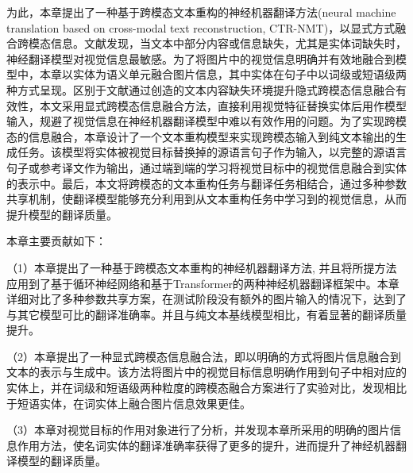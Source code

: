 为此，本章提出了一种基于跨模态文本重构的神经机器翻译方法(neural machine translation based on cross-modal text reconstruction, CTR-NMT)，以显式方式融合跨模态信息。文献\cite{53_caglayan-etal-2019-probing}发现，当文本中部分内容或信息缺失，尤其是实体词缺失时，神经翻译模型对视觉信息最敏感。为了将图片中的视觉信息明确并有效地融合到模型中，本章以实体为语义单元融合图片信息，其中实体在句子中以词级或短语级两种方式呈现。区别于文献\cite{53_caglayan-etal-2019-probing}通过创造的文本内容缺失环境提升隐式跨模态信息融合有效性，本文采用显式跨模态信息融合方法，直接利用视觉特征替换实体后用作模型输入，规避了视觉信息在神经机器翻译模型中难以有效作用的问题。为了实现跨模态的信息融合，本章设计了一个文本重构模型来实现跨模态输入到纯文本输出的生成任务。该模型将实体被视觉目标替换掉的源语言句子作为输入，以完整的源语言句子或参考译文作为输出，通过端到端的学习将视觉目标中的视觉信息融合到实体的表示中。最后，本文将跨模态的文本重构任务与翻译任务相结合，通过多种参数共享机制，使翻译模型能够充分利用到从文本重构任务中学习到的视觉信息，从而提升模型的翻译质量。

本章主要贡献如下：

（1）本章提出了一种基于跨模态文本重构的神经机器翻译方法, 并且将所提方法应用到了基于循环神经网络和基于Transformer的两种神经机器翻译框架中。本章详细对比了多种参数共享方案，在测试阶段没有额外的图片输入的情况下，达到了与其它模型可比的翻译准确率。并且与纯文本基线模型相比，有着显著的翻译质量提升。

（2）本章提出了一种显式跨模态信息融合法，即以明确的方式将图片信息融合到文本的表示与生成中。该方法将图片中的视觉目标信息明确作用到句子中相对应的实体上，并在词级和短语级两种粒度的跨模态融合方案进行了实验对比，发现相比于短语实体，在词实体上融合图片信息效果更佳。

（3）本章对视觉目标的作用对象进行了分析，并发现本章所采用的明确的图片信息作用方法，使名词实体的翻译准确率获得了更多的提升，进而提升了神经机器翻译模型的翻译质量。
